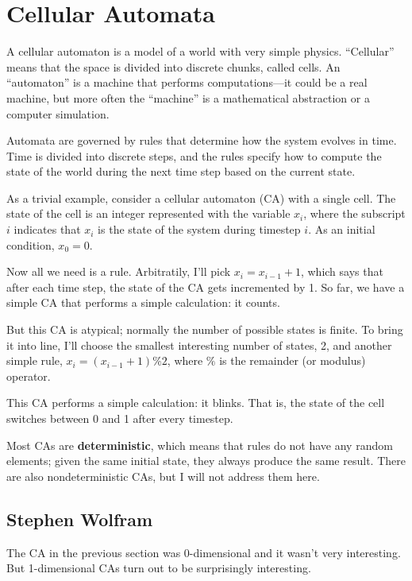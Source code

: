 \documentclass[10pt]{book}
\begin{document}
\chapter{Cellular Automata}

A cellular automaton is a model of a world with very simple physics.
``Cellular'' means that the space is divided into discrete chunks,
called cells.  An ``automaton'' is a machine that performs
computations---it could be a real machine, but more often the
``machine'' is a mathematical abstraction or a computer simulation.

Automata are governed by rules that determine how the system evolves
in time.  Time is divided into discrete steps, and the rules
specify how to compute the state of the world during the next time
step based on the current state.

As a trivial example, consider a cellular automaton (CA) with
a single cell.  The state of the cell is an integer represented
with the variable $x_i$, where the subscript $i$ indicates
that $x_i$ is the state of the system during timestep $i$.
As an initial condition, $x_0 = 0$.

Now all we need is a rule.  Arbitratily, I'll pick $x_i = x_{i-1} + 1$,
which says that after each time step, the state of the CA gets
incremented by 1.  So far, we have a simple CA that performs
a simple calculation: it counts.

But this CA is atypical; normally the number of
possible states is finite.  To bring it into line, I'll choose the
smallest interesting number of states, 2, and another simple rule,
$x_i = (x_{i-1} + 1) \% 2$, where $\%$ is the remainder (or
modulus) operator.

This CA performs a simple calculation: it blinks.  That is,
the state of the cell switches between 0 and 1 after every timestep.

Most CAs are {\bf deterministic}, which means that rules do not
have any random elements; given the same initial state, they
always produce the same result.  There are also nondeterministic
CAs, but I will not address them here.



\section{Stephen Wolfram}

The CA in the previous section was 0-dimensional and it wasn't very
interesting.  But 1-dimensional CAs turn out to be surprisingly
interesting.
\end{document}
